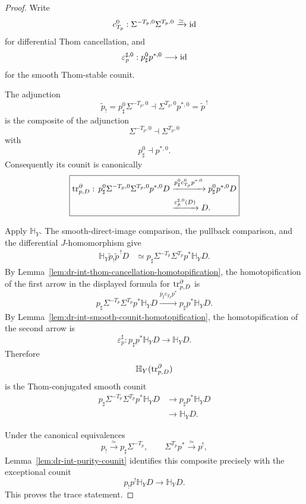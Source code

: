 \begin{proof}
Write
\[
    c_{T_p}^0:
    \Sigma^{-T_p,0}\Sigma^{T_p,0}
    \xrightarrow{\simeq}
    \operatorname{id}
\]
for differential Thom cancellation, and
\[
    \varepsilon_p^{\sharp,0}:
    p_\sharp^0p^{*,0}\longrightarrow\operatorname{id}
\]
for the smooth Thom-stable counit.

The adjunction
\[
    \widetilde p_!
    =
    p_\sharp^0\Sigma^{-T_p,0}
    \dashv
    \Sigma^{T_p,0}p^{*,0}
    =
    \widetilde p^{\,!}
\]
is the composite of the adjunction
\[
    \Sigma^{-T_p,0}
    \dashv
    \Sigma^{T_p,0}
\]
with
\[
    p_\sharp^0\dashv p^{*,0}.
\]
Consequently its counit is canonically
\[
\boxed{
\begin{aligned}
    \operatorname{tr}^{\partial}_{p,D}:\,
    p_\sharp^0
    \Sigma^{-T_p,0}
    \Sigma^{T_p,0}
    p^{*,0}D
    &\xrightarrow{
        p_\sharp^0c_{T_p}^0p^{*,0}
    }
    p_\sharp^0p^{*,0}D
    \\
    &\xrightarrow{
        \varepsilon_p^{\sharp,0}(D)
    }
    D.
\end{aligned}
}
\]

Apply \(\mathbb H_Y\).  The smooth-direct-image comparison,
the pullback comparison, and the differential \(J\)-homomorphism give
\[
\begin{aligned}
    \mathbb H_Y
    \widetilde p_!\widetilde p^{\,!}D
    &\simeq
    p_\sharp
    \Sigma^{-T_p}
    \Sigma^{T_p}
    p^*
    \mathbb H_YD.
\end{aligned}
\]
By
Lemma~\ref{lem:dr-int-thom-cancellation-homotopification}, the
homotopification of the first arrow in the displayed formula for
\(\operatorname{tr}^{\partial}_{p,D}\) is
\[
    p_\sharp
    \Sigma^{-T_p}\Sigma^{T_p}p^*\mathbb H_YD
    \xrightarrow{
        p_\sharp c_{T_p}p^*
    }
    p_\sharp p^*\mathbb H_YD.
\]
By
Lemma~\ref{lem:dr-int-smooth-counit-homotopification}, the
homotopification of the second arrow is
\[
    \varepsilon_p^\sharp:
    p_\sharp p^*\mathbb H_YD
    \longrightarrow
    \mathbb H_YD.
\]
Therefore
\[
    \mathbb H_Y(\operatorname{tr}^{\partial}_{p,D})
\]
is the Thom-conjugated smooth counit
\[
\begin{aligned}
    p_\sharp
    \Sigma^{-T_p}\Sigma^{T_p}
    p^*\mathbb H_YD
    &\longrightarrow
    p_\sharp p^*\mathbb H_YD
    \\
    &\longrightarrow
    \mathbb H_YD.
\end{aligned}
\]

Under the canonical equivalences
\[
    p_!\xrightarrow{\simeq}p_\sharp\Sigma^{-T_p},
    \qquad
    \Sigma^{T_p}p^*\xrightarrow{\simeq}p^!,
\]
Lemma~\ref{lem:dr-int-purity-counit} identifies this composite
precisely with the exceptional counit
\[
    p_!p^!\mathbb H_YD
    \longrightarrow
    \mathbb H_YD.
\]
This proves the trace statement.


\end{proof}

